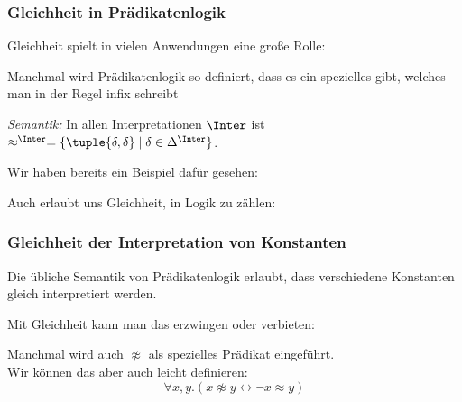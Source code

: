 \documentclass[aspectratio=1610,onlymath]{beamer}
\begin{document}
\begin{frame}\frametitle{Gleichheit in Prädikatenlogik}

Gleichheit spielt in vielen Anwendungen eine große Rolle:\smallskip

Manchmal wird Prädikatenlogik so definiert, dass es ein
spezielles  gibt, welches man in der Regel infix schreibt
\bigskip

\emph{Semantik:} In allen Interpretationen $\Inter$ ist $\approx^\Inter=\{\tuple{\delta,\delta}\mid \delta\in\Delta^\Inter\}$.
\bigskip\pause

Wir haben bereits ein Beispiel dafür gesehen:

\pause

Auch erlaubt uns Gleichheit, in Logik zu zählen:



\end{frame}

\begin{frame}\frametitle{Gleichheit der Interpretation von Konstanten}

Die übliche Semantik von Prädikatenlogik erlaubt, dass verschiedene 
Konstanten gleich interpretiert werden.\bigskip

Mit Gleichheit kann man das erzwingen oder verbieten:

Manchmal wird auch $\not\approx$ als spezielles Prädikat eingeführt.\\
Wir können das aber auch leicht definieren:
\[ \forall x,y.(x\not\approx y\leftrightarrow \neg x\approx y)\]

\end{frame}
\end{document}
